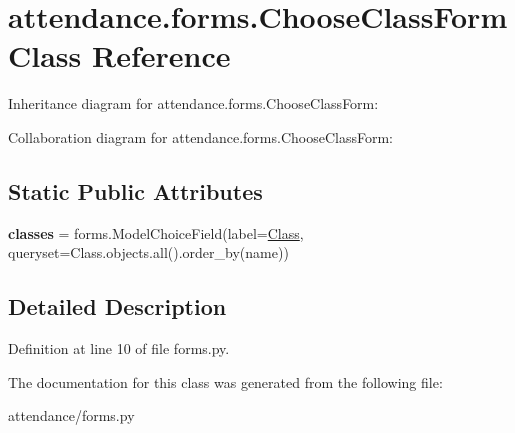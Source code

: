 \hypertarget{classattendance_1_1forms_1_1_choose_class_form}{}\section{attendance.\+forms.\+Choose\+Class\+Form Class Reference}
\label{classattendance_1_1forms_1_1_choose_class_form}


Inheritance diagram for attendance.\+forms.\+Choose\+Class\+Form\+:


Collaboration diagram for attendance.\+forms.\+Choose\+Class\+Form\+:
\subsection*{Static Public Attributes}
\begin{DoxyCompactItemize}
\item 
\hypertarget{classattendance_1_1forms_1_1_choose_class_form_a903259d77fca8eb66a3c6eb492e89445}{}\label{classattendance_1_1forms_1_1_choose_class_form_a903259d77fca8eb66a3c6eb492e89445} 
{\bfseries classes} = forms.\+Model\+Choice\+Field(label=\textquotesingle{}\hyperlink{classattendance_1_1models_1_1_class}{Class}\textquotesingle{}, queryset=Class.\+objects.\+all().order\+\_\+by(\textquotesingle{}name\textquotesingle{}))
\end{DoxyCompactItemize}


\subsection{Detailed Description}


Definition at line 10 of file forms.\+py.



The documentation for this class was generated from the following file\+:\begin{DoxyCompactItemize}
\item 
attendance/forms.\+py\end{DoxyCompactItemize}
